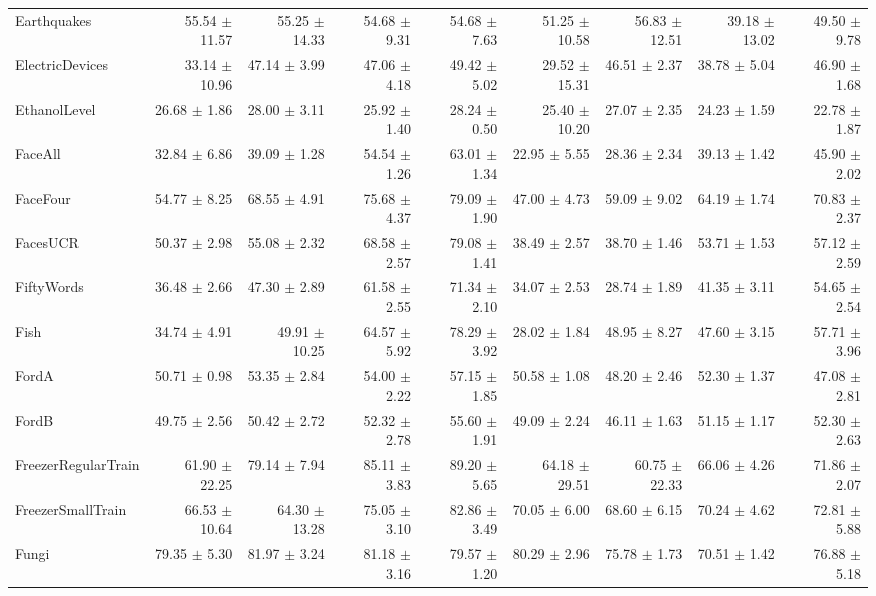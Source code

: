 \begin{landscape}
\begin{longtable}{lrrrrrrrr}
Earthquakes & 55.54 $\pm$ 11.57 & 55.25 $\pm$ 14.33 & 54.68 $\pm$ 9.31 & 54.68 $\pm$ 7.63 & 51.25 $\pm$ 10.58 & 56.83 $\pm$ 12.51 & 39.18 $\pm$ 13.02 & 49.50 $\pm$ 9.78 \\
ElectricDevices & 33.14 $\pm$ 10.96 & 47.14 $\pm$ 3.99 & 47.06 $\pm$ 4.18 & 49.42 $\pm$ 5.02 & 29.52 $\pm$ 15.31 & 46.51 $\pm$ 2.37 & 38.78 $\pm$ 5.04 & 46.90 $\pm$ 1.68 \\
EthanolLevel & 26.68 $\pm$ 1.86 & 28.00 $\pm$ 3.11 & 25.92 $\pm$ 1.40 & 28.24 $\pm$ 0.50 & 25.40 $\pm$ 10.20 & 27.07 $\pm$ 2.35 & 24.23 $\pm$ 1.59 & 22.78 $\pm$ 1.87 \\
FaceAll & 32.84 $\pm$ 6.86 & 39.09 $\pm$ 1.28 & 54.54 $\pm$ 1.26 & 63.01 $\pm$ 1.34 & 22.95 $\pm$ 5.55 & 28.36 $\pm$ 2.34 & 39.13 $\pm$ 1.42 & 45.90 $\pm$ 2.02 \\
FaceFour & 54.77 $\pm$ 8.25 & 68.55 $\pm$ 4.91 & 75.68 $\pm$ 4.37 & 79.09 $\pm$ 1.90 & 47.00 $\pm$ 4.73 & 59.09 $\pm$ 9.02 & 64.19 $\pm$ 1.74 & 70.83 $\pm$ 2.37 \\
FacesUCR & 50.37 $\pm$ 2.98 & 55.08 $\pm$ 2.32 & 68.58 $\pm$ 2.57 & 79.08 $\pm$ 1.41 & 38.49 $\pm$ 2.57 & 38.70 $\pm$ 1.46 & 53.71 $\pm$ 1.53 & 57.12 $\pm$ 2.59 \\
FiftyWords & 36.48 $\pm$ 2.66 & 47.30 $\pm$ 2.89 & 61.58 $\pm$ 2.55 & 71.34 $\pm$ 2.10 & 34.07 $\pm$ 2.53 & 28.74 $\pm$ 1.89 & 41.35 $\pm$ 3.11 & 54.65 $\pm$ 2.54 \\
Fish & 34.74 $\pm$ 4.91 & 49.91 $\pm$ 10.25 & 64.57 $\pm$ 5.92 & 78.29 $\pm$ 3.92 & 28.02 $\pm$ 1.84 & 48.95 $\pm$ 8.27 & 47.60 $\pm$ 3.15 & 57.71 $\pm$ 3.96 \\
FordA & 50.71 $\pm$ 0.98 & 53.35 $\pm$ 2.84 & 54.00 $\pm$ 2.22 & 57.15 $\pm$ 1.85 & 50.58 $\pm$ 1.08 & 48.20 $\pm$ 2.46 & 52.30 $\pm$ 1.37 & 47.08 $\pm$ 2.81 \\
FordB & 49.75 $\pm$ 2.56 & 50.42 $\pm$ 2.72 & 52.32 $\pm$ 2.78 & 55.60 $\pm$ 1.91 & 49.09 $\pm$ 2.24 & 46.11 $\pm$ 1.63 & 51.15 $\pm$ 1.17 & 52.30 $\pm$ 2.63 \\
FreezerRegularTrain & 61.90 $\pm$ 22.25 & 79.14 $\pm$ 7.94 & 85.11 $\pm$ 3.83 & 89.20 $\pm$ 5.65 & 64.18 $\pm$ 29.51 & 60.75 $\pm$ 22.33 & 66.06 $\pm$ 4.26 & 71.86 $\pm$ 2.07 \\
FreezerSmallTrain & 66.53 $\pm$ 10.64 & 64.30 $\pm$ 13.28 & 75.05 $\pm$ 3.10 & 82.86 $\pm$ 3.49 & 70.05 $\pm$ 6.00 & 68.60 $\pm$ 6.15 & 70.24 $\pm$ 4.62 & 72.81 $\pm$ 5.88 \\
Fungi & 79.35 $\pm$ 5.30 & 81.97 $\pm$ 3.24 & 81.18 $\pm$ 3.16 & 79.57 $\pm$ 1.20 & 80.29 $\pm$ 2.96 & 75.78 $\pm$ 1.73 & 70.51 $\pm$ 1.42 & 76.88 $\pm$ 5.18 \\

\end{longtable}
\end{landscape}
